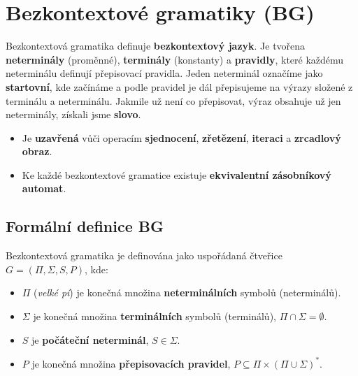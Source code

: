 \section{Bezkontextové gramatiky (BG)}
Bezkontextová gramatika definuje \textbf{bezkontextový jazyk}. Je tvořena \textbf{neterminály} (proměnné), \textbf{terminály} (konstanty) a \textbf{pravidly}, které každému neterminálu definují přepisovací pravidla. Jeden neterminál označíme jako \textbf{startovní}, kde začínáme a podle pravidel je dál přepisujeme na výrazy složené z terminálu a neterminálu. Jakmile už není co přepisovat, výraz obsahuje už jen neterminály, získali jsme \textbf{slovo}.

\begin{itemize}
    \item Je \textbf{uzavřená} vůči operacím \textbf{sjednocení}, \textbf{zřetězení}, \textbf{iteraci} a \textbf{zrcadlový obraz}.
    \item Ke každé bezkontextové gramatice existuje \textbf{ekvivalentní zásobníkový automat}.
\end{itemize}

\subsection{Formální definice BG}
Bezkontextová gramatika je definována jako uspořádaná čtveřice $G = (\Pi, \Sigma, S, P)$, kde:
\begin{itemize}
    \item $\Pi$ (\textit{velké pí}) je konečná množina \textbf{neterminálních} symbolů (neterminálů).
    \item $\Sigma$ je konečná množina \textbf{terminálních} symbolů (terminálů), $\Pi \cap \Sigma = \emptyset$.
    \item $S$ je \textbf{počáteční neterminál}, $S \in \Sigma$.
    \item $P$ je konečná množina \textbf{přepisovacích pravidel}, $P \subseteq \Pi \times (\Pi \cup \Sigma)^*$.
\end{itemize}

